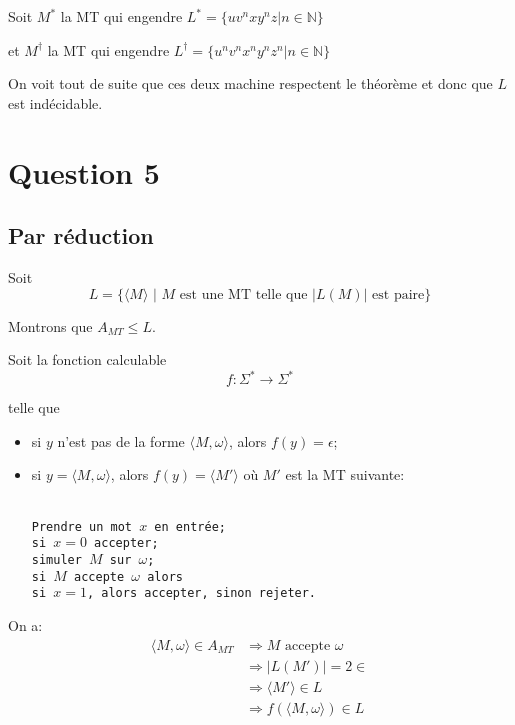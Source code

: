 \documentclass{article}
\newcommand\bk[1]{\langle #1 \rangle}
\newcommand\tab{\hspace{2cm}}
\begin{document}
Soit $M^*$ la MT qui engendre $L^*=\{uv^nxy^nz | n \in \mathbb{N}\}$

et $M^\dag$ la MT qui engendre $L^\dag=\{u^nv^nx^ny^nz^n | n \in \mathbb{N}\}$

On voit tout de suite que ces deux machine respectent le théorème et donc que $L$ est indécidable.

\pagebreak

\section{Question 5}
\subsection{Par réduction}
Soit
$$ L= \{\bk{M} \text{ | $M$ est une MT telle que $|L(M)|$ est paire}\} $$

Montrons que $A_{MT} \leq L$.

Soit la fonction calculable
$$f : \Sigma^* \rightarrow \Sigma^*$$

telle que

\begin{itemize}
\item si $y$ n'est pas de la forme $\bk{M, \omega}$, alors $f(y)=\epsilon$;
\item si $y=\bk{M, \omega}$, alors $f(y)=\bk{M'}$ où $M'$ est la MT suivante:

  \hspace{2cm}
  \begin{minipage}{12cm}
    \texttt{
      \\
      Prendre un mot $x$ en entrée;\\
      si $x=0$ accepter;\\
      simuler $M$ sur $\omega$;\\
      si $M$ accepte $\omega$ alors\\
      \tab{} si $x = 1$, alors accepter, sinon rejeter.
      }
  \end{minipage}
\end{itemize}

On a:
\begin{align*}
  \bk{M, \omega} \in A_{MT} &\Rightarrow M \text{ accepte } \omega\\
  &\Rightarrow |L(M')| = 2 \in\\
  &\Rightarrow \bk{M'} \in L\\
  &\Rightarrow f(\bk{M, \omega}) \in L
\end{align*}
\end{document}
